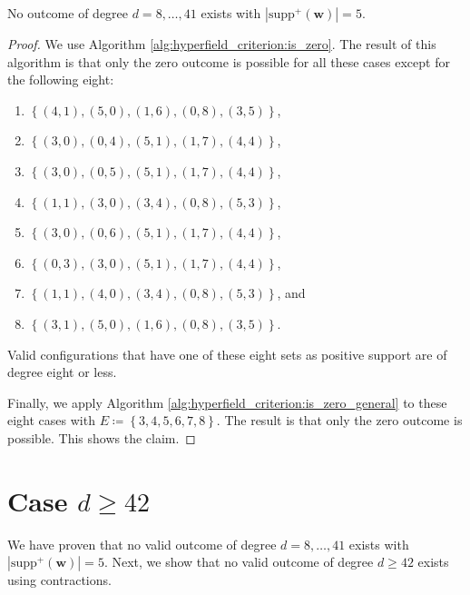 \begin{proposition}\label{prop:uiwuwinca}
    No outcome of degree \( d = 8, \dots, 41 \) exists with \( |\mathrm{supp}^+(\mathbf w)| = 5 \).
\end{proposition}

\begin{proof}
    We use Algorithm \ref{alg:hyperfield_criterion:is_zero}. The result of this algorithm is that only the zero outcome is possible for all these cases except for the following eight:
    \begin{enumerate}
        \item \( \left\{ (4, 1), (5, 0), (1, 6), (0, 8), (3, 5) \right\} \),
        \item \( \left\{  (3, 0), (0, 4), (5, 1), (1, 7), (4, 4) \right\} \),
        \item \( \left\{  (3, 0), (0, 5), (5, 1), (1, 7), (4, 4) \right\} \),
        \item \( \left\{   (1, 1), (3, 0), (3, 4), (0, 8), (5, 3) \right\} \),
        \item \( \left\{   (3, 0), (0, 6), (5, 1), (1, 7), (4, 4) \right\} \),
        \item \( \left\{   (0, 3), (3, 0), (5, 1), (1, 7), (4, 4) \right\} \),
        \item \( \left\{  (1, 1), (4, 0), (3, 4), (0, 8), (5, 3) \right\} \), and
        \item \( \left\{  (3, 1), (5, 0), (1, 6), (0, 8), (3, 5) \right\} \).
    \end{enumerate}
    Valid configurations that have one of these eight sets as positive support are of degree eight or less. 
    
    Finally, we apply Algorithm \ref{alg:hyperfield_criterion:is_zero_general} to these eight cases with \( E \coloneqq \left\{ 3,4,5,6,7,8 \right\} \). The result is that only the zero outcome is possible. This shows the claim.
\end{proof}

\section{Case \( d \geq 42 \)}

We have proven that no valid outcome of degree \( d = 8, \dots, 41 \) exists with \( |\mathrm{supp}^+(\mathbf w)| = 5 \). Next, we show that no valid outcome of degree \( d \geq 42 \) exists using contractions.

